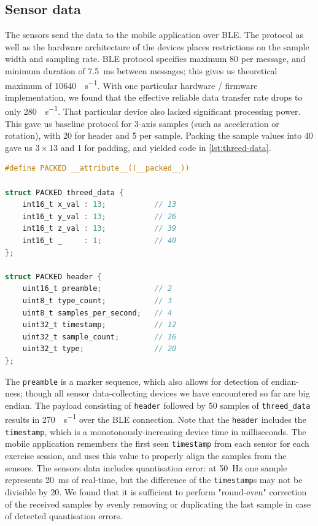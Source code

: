 
\subsection{Sensor data}

The sensors send the data to the mobile application over BLE. The protocol as well as the hardware architecture of the devices places restrictions on the sample width and sampling rate. BLE protocol specifies maximum \SI{80}{\byte} per message, and minimum duration of \SI{7.5}{\milli\second} between messages; this gives us theoretical maximum of \SI{10640}{\byte\per\second}. With one particular hardware / firmware implementation, we found that the effective reliable data transfer rate drops to only \SI{280}{\byte\per\second}. That particular device also lacked significant processing power. This gave us baseline protocol for 3-axis samples (such as acceleration or rotation), with \SI{20}{\byte} for header and \SI{5}{\byte} per sample. Packing the sample values into \SI{40}{\bit} gave us $3 \times$\SI{13}{\bit} and \SI{1}{\bit} for padding, and yielded code in \autoref{lst:threed-data}.

\begin{lstlisting}[language=C,caption={BLE 3-axis data},label={lst:threed-data}]
#define PACKED __attribute__((__packed__))

struct PACKED threed_data {
    int16_t x_val : 13;           // 13
    int16_t y_val : 13;           // 26
    int16_t z_val : 13;           // 39
    int16_t _     : 1;            // 40
};

struct PACKED header {
    uint16_t preamble;            // 2
    uint8_t type_count;           // 3
    uint8_t samples_per_second;   // 4
    uint32_t timestamp;           // 12
    uint32_t sample_count;        // 16
    uint32_t type;                // 20
};
\end{lstlisting}

The \lstinline{preamble} is a marker sequence, which also allows for detection of endian-ness; though all sensor data-collecting devices we have encountered so far are big endian. The payload consisting of \lstinline{header} followed by 50 samples of \lstinline{threed_data} results in \SI{270}{\byte\per\second} over the BLE connection. Note that the \lstinline{header} includes the \lstinline{timestamp}, which is a monotonously-increasing device time in milliseconds. The mobile application remembers the first seen \lstinline{timestamp} from each sensor for each exercise session, and uses this value to properly align the samples from the sensors. The sensors data includes quantisation error: at \SI{50}{\hertz} one sample represents \SI{20}{\milli\second} of real-time, but the difference of the \lstinline{timestamp}s may not be divisible by $20$. We found that it is sufficient to perform "round-even" correction of the received samples by evenly removing or duplicating the last sample in case of detected quantisation errors.

